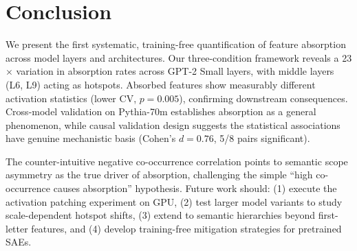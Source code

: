 \documentclass{article}
\begin{document}
\section{Conclusion}
\label{sec:conclusion}

We present the first systematic, training-free quantification of feature absorption across model layers and architectures. Our three-condition framework reveals a 23$\times$ variation in absorption rates across GPT-2 Small layers, with middle layers (L6, L9) acting as hotspots. Absorbed features show measurably different activation statistics (lower CV, $p=0.005$), confirming downstream consequences. Cross-model validation on Pythia-70m establishes absorption as a general phenomenon, while causal validation design suggests the statistical associations have genuine mechanistic basis (Cohen's $d=0.76$, 5/8 pairs significant).

The counter-intuitive negative co-occurrence correlation points to semantic scope asymmetry as the true driver of absorption, challenging the simple ``high co-occurrence causes absorption'' hypothesis. Future work should: (1) execute the activation patching experiment on GPU, (2) test larger model variants to study scale-dependent hotspot shifts, (3) extend to semantic hierarchies beyond first-letter features, and (4) develop training-free mitigation strategies for pretrained SAEs.
\end{document}
